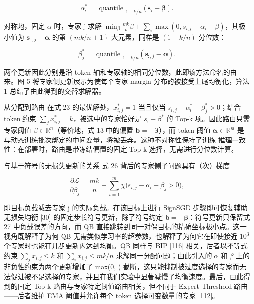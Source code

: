 \documentclass[
  10
]{article}
\begin{document}
\[
\alpha_ {i} ^ {*} = \text { quantile } _ {1 - k / n} (\boldsymbol {s} _ {i} - \boldsymbol {\beta}).\tag{25}
\]

对称地，固定 \(\alpha\) 时，专家 j 求解 \(\min_{\beta} \frac { m k } { n } \beta + \sum _ { i } \max ( 0 , s _ { i , j } - \alpha _ { i } - \beta )\)，其极小值为 \(\mathbf { s } _ { : , j } - \boldsymbol { \alpha }\) 的第 \((mk/n+1)\) 大元素，同样是 \(( 1 - k / n )\) 分位数：

\[
\beta_ {j} ^ {*} = \text { quantile } _ {1 - k / n} \left(\boldsymbol {s} _ {:, j} - \boldsymbol {\alpha}\right).\tag{26}
\]

两个更新因此分别是沿 token 轴和专家轴的相同分位数，此即该方法命名的由来。图 5 将专家侧更新展示为使每个专家 margin 分布的被接受上尾均衡化，算法 1 总结了由此得到的交替求解器。

从分配到路由 在式 23 的最优解处，\(x _ { i , j } ^ { * } = 1\) 当且仅当 \(s _ { i , j } - \alpha _ { i } ^ { * } - \beta _ { j } ^ { * } > 0\)；结合 token 约束 \(\textstyle \sum _ { j } x _ { i , j } ^ { * } = k\)，被选中的专家恰好是 \(s _ { i } - \beta ^ { * }\) 的 Top-k 项。因此路由只需专家阈值 \(\beta \in \mathbb { R } ^ { n }\)（等价地，式 13 中的偏置 \(\boldsymbol { b } = - \boldsymbol { \beta }\)），而 token 阈值 \(\pmb { \alpha } \in \mathbb { R } ^ { m }\) 是与动态训练批次绑定的中间变量，将被丢弃。这种不对称性保持了训练-推理一致性：在部署时，路由是带冻结偏置的固定 Top-k 选择，无需进行分位数计算。

与基于符号的无损失更新的关系 式 26 背后的专家侧子问题具有（次）梯度

\[
\frac {\partial \mathcal {L}}{\partial \beta_ {j}} = \frac {m k}{n} - \sum_ {i = 1} ^ {m} \chi \big (s _ {i, j} - \alpha_ {i} - \beta_ {j} > 0 \big),\tag{27}
\]

即目标负载减去专家 j 的实际负载。在该目标上进行 SignSGD 步骤即可恢复辅助无损失均衡 {[}30{]} 的固定步长符号更新，除了符号约定 \(\boldsymbol { b } = - \boldsymbol { \beta }\)：符号更新只保留式 27 中负载误差的方向，而 QB 直接跳转到同一对偶目标的精确坐标极小点。这一视角既解释了为何 QB 无需类似学习率的超参数，也解释了为何它在即使接近 \(10^3\) 个专家时也能在几步更新内达到均衡。QB 同样与 BIP {[}116{]} 相关，后者以不等式约束 \(\textstyle \sum _ { j } x _ { i , j } \leq k\) 和 \(\textstyle \sum _ { i } x _ { i , j } \leq m k / n\) 求解同一分配问题；由此引入的 \(\alpha\) 和 \(\beta\) 上的非负性约束为两个更新增加了 max(0, ) 截断，这只能抑制被过度选择的专家而无法促进被不足选择的专家，并且在我们实验中显著减慢了均衡速度。最后，由此得到的固定 Top-k 路由与专家特定阈值路由相关，但不同于 Expert Threshold 路由——后者维护 EMA 阈值并允许每个 token 选择可变数量的专家 {[}112{]}。
\end{document}
